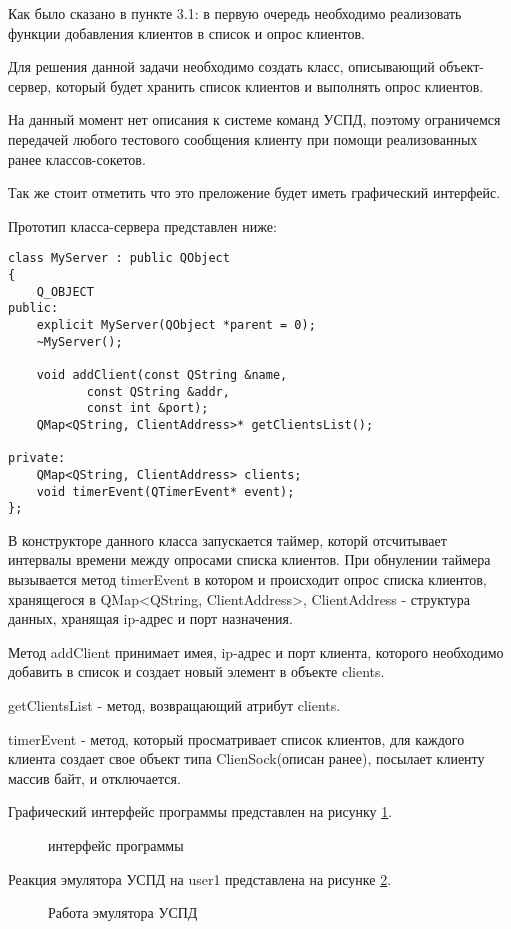 Как было сказано в пункте 3.1: в первую очередь необходимо реализовать функции добавления клиентов в список и опрос клиентов. 

Для решения данной задачи необходимо создать класс, описывающий объект-сервер, который будет хранить список клиентов и выполнять опрос клиентов.

На данный момент нет описания к системе команд УСПД, поэтому ограничемся передачей любого тестового сообщения клиенту при помощи реализованных ранее классов-сокетов.

Так же стоит отметить что это преложение будет иметь графический интерфейс.

Прототип класса-сервера представлен ниже:

\begin{lstlisting}
class MyServer : public QObject
{
    Q_OBJECT
public:
    explicit MyServer(QObject *parent = 0);
    ~MyServer();

    void addClient(const QString &name, 
		   const QString &addr, 
		   const int &port);
    QMap<QString, ClientAddress>* getClientsList();

private:
    QMap<QString, ClientAddress> clients;
    void timerEvent(QTimerEvent* event);
};
\end{lstlisting}

В конструкторе данного класса запускается таймер, которй отсчитывает интервалы времени между опросами списка клиентов. При обнулении таймера вызывается метод timerEvent в котором и происходит опрос списка клиентов, хранящегося в QMap<QString, ClientAddress>, ClientAddress - структура данных, хранящая ip-адрес и порт назначения.

Метод addClient принимает имея, ip-адрес и порт клиента, которого необходимо добавить в список и создает новый элемент в объекте clients.

getClientsList - метод, возвращающий атрибут clients.

timerEvent - метод, который просматривает список клиентов, для каждого клиента создает свое объект типа ClienSock(описан ранее), посылает клиенту массив байт, и отключается. 

\newpage
Графический интерфейс программы представлен на рисунку \ref{server_gui:server_gui}.

\begin{figure}[ht!]
 \caption{интерфейс программы}
 \label{server_gui:server_gui}
\end{figure}

Реакция эмулятора УСПД на user1 представлена на рисунке \ref{client_log:client_log}.

\begin{figure}[ht!]
 \caption{Работа эмулятора УСПД}
 \label{client_log:client_log}
\end{figure}



